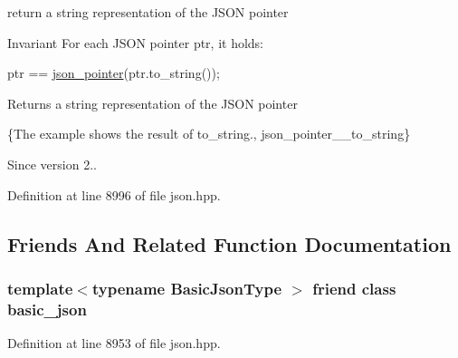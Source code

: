 return a string representation of the J\+S\+ON pointer 

\begin{DoxyInvariant}{Invariant}
For each J\+S\+ON pointer {\ttfamily ptr}, it holds\+: 
\begin{DoxyCode}
ptr == \hyperlink{classnlohmann_1_1json__pointer_a7f32d7c62841f0c4a6784cf741a6e4f8}{json\_pointer}(ptr.to\_string());
\end{DoxyCode}

\end{DoxyInvariant}
\begin{DoxyReturn}{Returns}
a string representation of the J\+S\+ON pointer
\end{DoxyReturn}
\{The example shows the result of {\ttfamily to\+\_\+string}., json\+\_\+pointer\+\_\+\+\_\+to\+\_\+string\}

\begin{DoxySince}{Since}
version 2.. 
\end{DoxySince}


Definition at line 8996 of file json.\+hpp.



\subsection{Friends And Related Function Documentation}
\subsubsection[{\texorpdfstring{basic\+\_\+json}{basic_json}}]{\setlength{\rightskip}{0pt plus 5cm}template$<$typename Basic\+Json\+Type $>$ friend class {\bf basic\+\_\+json}\hspace{0.3cm}{\ttfamily [friend]}}\hypertarget{classnlohmann_1_1json__pointer_ada3100cdb8700566051828f1355fa745}{}\label{classnlohmann_1_1json__pointer_ada3100cdb8700566051828f1355fa745}


Definition at line 8953 of file json.\+hpp.

